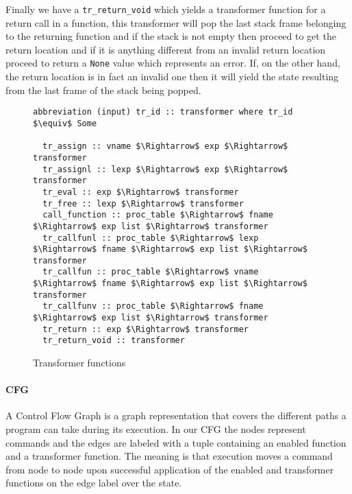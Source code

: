 Finally we have a \verb|tr_return_void| which yields a transformer function for a return call in a function, this transformer will pop the last stack frame belonging to the returning function and if the stack is not empty then proceed to get the return location and if it is anything different from an invalid return location proceed to return a \verb|None| value which represents an error.
If, on the other hand, the return location is in fact an invalid one then it will yield the state resulting from the last frame of the stack being popped.

\begin{comment}
FIXME
\end{comment}

\begin{figure}
  \begin{lstlisting}[frame=single, mathescape=true]
  abbreviation (input) tr_id :: transformer where tr_id $\equiv$ Some

  tr_assign :: vname $\Rightarrow$ exp $\Rightarrow$ transformer
  tr_assignl :: lexp $\Rightarrow$ exp $\Rightarrow$ transformer
  tr_eval :: exp $\Rightarrow$ transformer
  tr_free :: lexp $\Rightarrow$ transformer
  call_function :: proc_table $\Rightarrow$ fname $\Rightarrow$ exp list $\Rightarrow$ transformer
  tr_callfunl :: proc_table $\Rightarrow$ lexp $\Rightarrow$ fname $\Rightarrow$ exp list $\Rightarrow$ transformer
  tr_callfun :: proc_table $\Rightarrow$ vname $\Rightarrow$ fname $\Rightarrow$ exp list $\Rightarrow$ transformer
  tr_callfunv :: proc_table $\Rightarrow$ fname $\Rightarrow$ exp list $\Rightarrow$ transformer
  tr_return :: exp $\Rightarrow$ transformer
  tr_return_void :: transformer
  \end{lstlisting}

  \caption{Transformer functions}
  \label{fig:transformer_def}
\end{figure}


\paragraph{CFG}
A Control Flow Graph is a graph representation that covers the different paths a program can take during its execution.
In our CFG the nodes represent commands and the edges are labeled with a tuple containing an enabled function and a transformer function.
The meaning is that execution moves a command from node to node upon successful application of the enabled and transformer functions on the edge label over the state.


